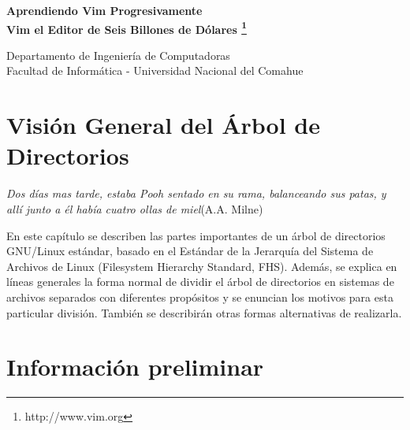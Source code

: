 ﻿
\usepackage{fancyhdr}
	\pagestyle{fancy}
\usepackage{lastpage}	
	\lhead{}
	\chead{}
	\rhead{}
	\cfoot{}
	\rfoot{\footnotesize \thepage\ }	%
	\renewcommand{\headrulewidth}{0.0pt}
	\renewcommand{\footrulewidth}{0.4pt}

\def\ti#1#2{\texttt{#1} & #2 \\ }





\setlength{\parindent}{0pt}


\makeatletter
{\color{bl} \centering \huge \sc \textbf{
Aprendiendo Vim Progresivamente \\ 
\large \vspace*{-8pt} \color{black} Vim el Editor de Seis Billones de Dólares
\footnote{http://www.vim.org}
\vspace*{8pt} }\par}
\makeatother


\makeatletter
{\centering \small 
	Departamento de Ingeniería de Computadoras \\
	Facultad de Informática - Universidad Nacional del Comahue \\
	\vspace{20pt} }
\makeatother


\section{Visión General del Árbol de Directorios}


\textit{Dos días mas tarde, estaba Pooh sentado en su rama,
balanceando sus patas, y allí junto a él había cuatro ollas de miel}(A.A.
Milne)

 En este capítulo se describen las partes importantes de un árbol de
directorios GNU/Linux estándar, basado en el Estándar de la Jerarquía del
Sistema de Archivos de Linux (Filesystem Hierarchy Standard, FHS). Además, se
explica en líneas generales la forma normal de dividir el árbol de directorios
en  sistemas de archivos separados con diferentes propósitos y se enuncian los
motivos para esta particular división. También se describirán otras formas
alternativas de realizarla.  

\section{ Información preliminar}


